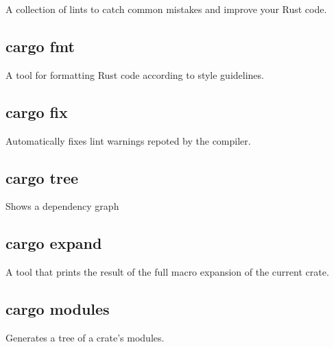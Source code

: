 \documentclass[a4paper]{article}
\begin{document}
A collection of lints to catch common mistakes and improve your Rust code.

\subsection{cargo fmt}

A tool for formatting Rust code according to style guidelines.

\subsection{cargo fix}

Automatically fixes lint warnings repoted by the compiler.

\subsection{cargo tree}

Shows a dependency graph

\subsection{cargo expand}

A tool that prints the result of the full macro expansion of the current crate.

\subsection{cargo modules}

Generates a tree of a crate's modules.
\end{document}
